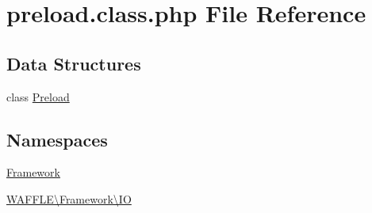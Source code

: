 \hypertarget{preload_8class_8php}{}\section{preload.\+class.\+php File Reference}
\label{preload_8class_8php}
\subsection*{Data Structures}
\begin{DoxyCompactItemize}
\item 
class \hyperlink{class_w_a_f_f_l_e_1_1_framework_1_1_i_o_1_1_preload}{Preload}
\end{DoxyCompactItemize}
\subsection*{Namespaces}
\begin{DoxyCompactItemize}
\item 
 \hyperlink{namespace_framework}{Framework}
\item 
 \hyperlink{namespace_w_a_f_f_l_e_1_1_framework_1_1_i_o}{W\+A\+F\+F\+L\+E\textbackslash{}\+Framework\textbackslash{}\+IO}
\end{DoxyCompactItemize}
